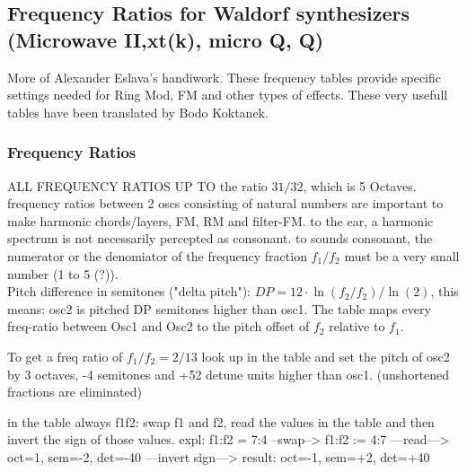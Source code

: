 \subsection{Frequency Ratios for Waldorf synthesizers (Microwave II,xt(k), micro Q, Q)}
More of Alexander Eslava's handiwork. These frequency tables provide specific settings needed for Ring Mod, FM and other types of effects. These very usefull tables have been translated by Bodo Koktanek. 
\subsubsection{Frequency Ratios}
ALL FREQUENCY RATIOS UP TO the ratio $31/32$, which is 5 Octaves.\\
frequency ratios between 2 oscs consisting of natural numbers are important to make harmonic chords/layers, FM, RM and filter-FM.
to the ear, a harmonic spectrum is not necessarily percepted as consonant. to sounds consonant, the numerator or the denomiator of the frequency fraction $f_1/f_2$ must be a very small number (1 to 5 (?)). \\
Pitch difference in semitones ("delta pitch"): $DP = 12 \cdot \ln(f_2/f_2)/\ln(2)$, this means: osc2 is pitched DP semitones higher than osc1.
The table maps every freq-ratio between Osc1 and Osc2 to the pitch offset of $f_2$ relative to $f_1$.
\begin{example}
	To get a freq ratio of $f_1 / f_2 = 2 / 13$ look up in the table and set the pitch of osc2 by 3 octaves, -4 semitones and +52 detune units higher than osc1. (unshortened fractions are eliminated)
\end{example}
in the table always f1f2: swap f1 and f2, read the values in the table and then invert the sign of those values.
expl: f1:f2 = 7:4
--swap--> f1:f2 := 4:7
---read---> oct=1, sem=-2, det=-40
---invert sign---> result: oct=-1, sem=+2, det=+40

